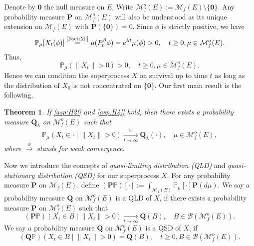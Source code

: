 \documentclass[12pt,a4paper]{amsart}
\numberwithin{equation}{section}
\theoremstyle{plain}
\newtheorem{thm}{Theorem}[section]
\theoremstyle{definition}
\theoremstyle{remark}
\begin{document}
	Denote by $\mathbf 0$ the null measure on $E$. %
	Write $\mathcal M_f^o(E) := \mathcal M_f(E)\setminus \{ \mathbf 0\}$. %
	Any probability measure $\mathbf P$ on $\mathcal M_f^o(E)$ will also be understood as its unique extension on $\mathcal M_f(E)$ with  $\mathbf P(\{\mathbf 0\}) = 0$. %
	Since $\phi$ is strictly positive, we have
\begin{equation}
	\mathbb P_\mu[X_t(\phi)]
	\overset{\text{\eqref{Fact:M!}}}= \mu(P_t^\beta \phi)
	=e^{\lambda t}\mu(\phi)>0, \quad t\geq 0, \mu \in \mathcal M_f^o(E).
\end{equation}
	Thus,
\begin{equation}  \label{lem:Nd!}
		\mathbb P_\mu(\|X_t\| > 0) > 0,\quad t\geq 0,\mu \in \mathcal M_f^o(E).
\end{equation}
	Hence we can condition the superprocess $X$ on survival up to time $t$ as long as the distribution of $X_0$ is not concentrated on $\{\mathbf 0\}$.
	Our first main result is the following.
	
\begin{thm} \label{Theorem:Y:H1:H2:H3:H4}
	If \eqref{asp:H2!} and \eqref{asp:H4!} hold, then there exists a probability measure $\mathbf Q_\lambda$ 
	on $\mathcal M_f^o(E)$ such that
\begin{align}
 	\mathbb P_\mu \left(X_t \in \cdot \middle| \|X_t\| > 0 \right) \xrightarrow[t\to \infty]{w} \mathbf Q_\lambda(\cdot),
 	\quad \mu \in \mathcal M_f^o(E),
\end{align}
	where $\xrightarrow{w}$ stands for weak convergence. 
\end{thm}

	Now we introduce the concepts of \emph{quasi-limiting distribution (QLD)} and \emph{quasi-stationary distribution (QSD)} for our superprocess $X$.
	For any probability measure $\mathbf P$ on $\mathcal M_f(E)$, define $(\mathbf P\mathbb P)[\cdot] := \int_{\mathcal M_f(E)} \mathbb P_\mu[\cdot] \mathbf P(d\mu)$.
	We say a probability measure $\mathbf Q$ on $\mathcal M^o_f(E)$ is a QLD of $X$, if there exists a probability measure $\mathbf P$ on %
	$\mathcal M_f^o(E)$ such that
	\[
	(\mathbf P\mathbb P)\left(X_t \in B \middle| \|X_t\|>0\right) \xrightarrow[t\to \infty]{} \mathbf Q(B), 
	\quad B\in \mathcal B(\mathcal M^o_f(E)).
	\]
	We say a probability measure $\mathbf Q$ on $\mathcal M^o_f(E)$ is a QSD of $X$, if
	\[
	(\mathbf Q \mathbb P) \left( X_t \in B \middle | \|X_t\|>0 \right) = \mathbf Q(B), 
	\quad t\geq 0, B \in \mathcal B(\mathcal M^o_f(E)).
	\]
	
\end{document}
